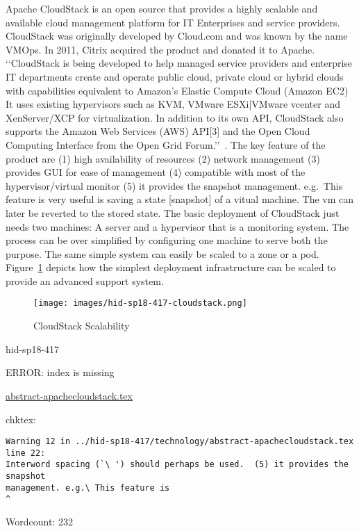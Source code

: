 Apache CloudStack is an open source that provides a highly scalable
and available cloud management platform for IT Enterprises and service
providers. CloudStack was originally developed by Cloud.com and was
known by the name VMOps.  In 2011, Citrix acquired the product and
donated it to Apache.
‘‘CloudStack is being developed to help managed service providers and
enterprise IT departments create and operate public cloud, private
cloud or hybrid clouds with capabilities equivalent to Amazon's
Elastic Compute Cloud (Amazon EC2) It uses existing hypervisors such
as KVM, VMware ESXi|VMware vcenter and XenServer/XCP for
virtualization. In addition to its own API, CloudStack also supports
the Amazon Web Services (AWS) API[3] and the Open Cloud Computing
Interface from the Open Grid Forum.’’~\cite{hid-sp18-417-wiki-cloudStack}.
The key feature of the product are 
 (1) high availability of resources
 (2) network management
 (3) provides GUI for ease of management
 (4) compatible with most of the hypervisor/virtual monitor
 (5) it provides the snapshot management. e.g.\ This feature is 
very useful is saving a state [snapshot] of a vitual machine. 
The vm can later be reverted to the stored state.  
The basic deployment of CloudStack just needs two machines: 
 A server and a hypervisor that is a monitoring system.  The process
can be over simplified by configuring one machine to serve both the
purpose.
The same simple system can easily be scaled to a zone or a pod.
Figure~\ref{F:cloudstack-scalabuility} depicts how the simplest
deployment infrastructure can be scaled to provide an advanced support
system.

\begin{figure}[htb]
\texttt{[image: images/hid-sp18-417-cloudstack.png]}
\caption{CloudStack Scalability~\cite{hid-sp18-417-cloudstack-scaling}}
\label{F:cloudstack-scalabuility}
\end{figure}


\begin{IU}

hid-sp18-417

ERROR: index is missing

\href{https://github.com/cloudmesh-community/hid-sp18-417/blob/master//technology/abstract-apachecloudstack.tex}{abstract-apachecloudstack.tex}

 
chktex:
\begin{tiny}
\begin{verbatim}
Warning 12 in ../hid-sp18-417/technology/abstract-apachecloudstack.tex line 22:
Interword spacing (`\ ') should perhaps be used.  (5) it provides the snapshot
management. e.g.\ This feature is                                             ^
\end{verbatim}
\end{tiny}

Wordcount: 232

\end{IU}

